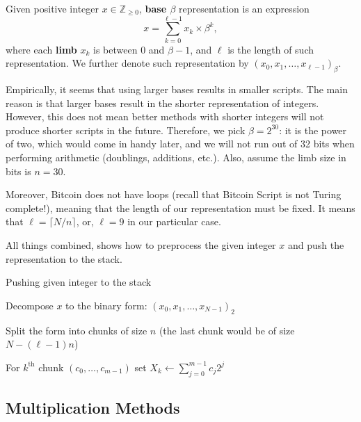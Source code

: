 \documentclass{iacrtrans}
\begin{document}
\begin{definition}
    Given positive integer $x \in \mathbb{Z}_{\geq 0}$, \textbf{base $\beta$} representation is an expression
    \begin{equation}
        x = \sum_{k=0}^{\ell-1}x_k \times\beta^k,
    \end{equation}
    where each \textbf{limb} $x_k$ is between $0$ and $\beta-1$, and $\ell$ is the length of such representation. We further denote such representation by $(x_0,x_1,\dots,x_{\ell-1})_{\beta}$. 
\end{definition}

Empirically, it seems that using larger bases results in smaller scripts. The main reason is that larger bases result in the shorter representation of integers. However, this does not mean better methods with shorter integers will not produce shorter scripts in the future. Therefore, we pick $\beta=2^{30}$: it is the power of two, which would come in handy later, and we will not run out of 32 bits when performing arithmetic (doublings, additions, etc.). Also, assume the limb size in bits is $n=30$.

Moreover, Bitcoin does not have loops (recall that Bitcoin Script is not Turing complete!), meaning that the length of our representation must be fixed. It means that $\ell = \lceil N/n \rceil$, or, $\ell=9$ in our particular case. 

All things combined,  shows how to preprocess the given integer $x$ and push the representation to the stack.

\begin{algorithm}
\caption{Pushing given integer to the stack}\label{alg:integer_representation}

Decompose $x$ to the binary form: $(x_0,x_1,\dots,x_{N-1})_2$

Split the form into chunks of size $n$ (the last chunk would be of size $N-(\ell-1)n$)

For $k^{\text{th}}$ chunk $(c_0,\dots,c_{m-1})$ set $X_k \gets \sum_{j=0}^{m-1} c_j2^j$


\end{algorithm}

\subsection{Multiplication Methods}\label{section:multiplication_methods}
\end{document}
